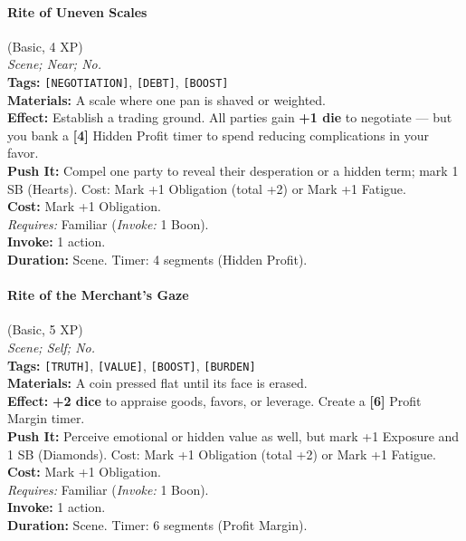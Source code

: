 \paragraph{Rite of Uneven Scales} (Basic, 4 XP) \hfill \\
\emph{Scene; Near; No.} \\
\textbf{Tags:} \texttt{[NEGOTIATION]}, \texttt{[DEBT]}, \texttt{[BOOST]} \\
\textbf{Materials:} A scale where one pan is shaved or weighted. \\
\textbf{Effect:} Establish a trading ground. All parties gain \textbf{+1 die} to negotiate --- but you bank a \textbf{[4]} Hidden Profit timer to spend reducing complications in your favor. \\
\textbf{Push It:} Compel one party to reveal their desperation or a hidden term; mark 1 SB (Hearts). Cost: Mark +1 Obligation (total +2) or Mark +1 Fatigue. \\
\textbf{Cost:} Mark +1 Obligation. \\
\textit{Requires:} Familiar (\textit{Invoke:} 1 Boon). \\
\textbf{Invoke:} 1 action. \\
\textbf{Duration:} Scene. Timer: 4 segments (Hidden Profit).

\paragraph{Rite of the Merchant's Gaze} (Basic, 5 XP) \hfill \\
\emph{Scene; Self; No.} \\
\textbf{Tags:} \texttt{[TRUTH]}, \texttt{[VALUE]}, \texttt{[BOOST]}, \texttt{[BURDEN]} \\
\textbf{Materials:} A coin pressed flat until its face is erased. \\
\textbf{Effect:} \textbf{+2 dice} to appraise goods, favors, or leverage. Create a \textbf{[6]} Profit Margin timer. \\
\textbf{Push It:} Perceive emotional or hidden value as well, but mark +1 Exposure and 1 SB (Diamonds). Cost: Mark +1 Obligation (total +2) or Mark +1 Fatigue. \\
\textbf{Cost:} Mark +1 Obligation. \\
\textit{Requires:} Familiar (\textit{Invoke:} 1 Boon). \\
\textbf{Invoke:} 1 action. \\
\textbf{Duration:} Scene. Timer: 6 segments (Profit Margin).

